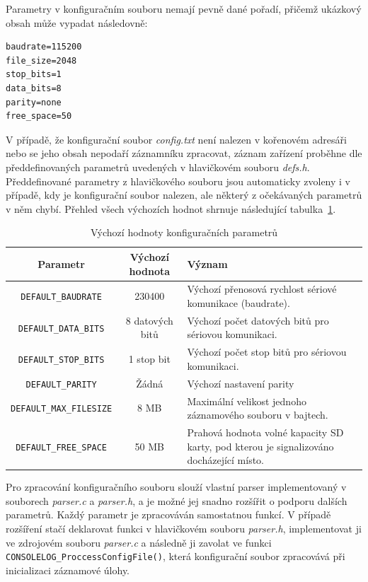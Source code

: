 Parametry v konfiguračním souboru nemají pevně dané pořadí, přičemž ukázkový obsah může vypadat následovně:

\begin{verbatim}
baudrate=115200
file_size=2048
stop_bits=1
data_bits=8
parity=none
free_space=50
\end{verbatim}

V případě, že konfigurační soubor \textit{config.txt} není nalezen v kořenovém adresáři nebo se jeho obsah nepodaří záznamníku zpracovat, záznam zařízení proběhne dle předdefinovaných parametrů uvedených v hlavičkovém souboru \textit{defs.h}. Předdefinované parametry z hlavičkového souboru jsou automaticky zvoleny i v případě, kdy je konfigurační soubor nalezen, ale některý z očekávaných parametrů v něm chybí. Přehled všech výchozích hodnot shrnuje následující tabulka~\ref{tab:default-parameters}.

\begin{table}[h]
    \centering
    \begin{tabularx}{\textwidth}{|c|c|X|}
        \hline
        \textbf{Parametr} & \textbf{Výchozí hodnota} & \textbf{Význam} \\
        \hline
        \texttt{DEFAULT\_BAUDRATE} & 230400 & Výchozí přenosová rychlost sériové komunikace (baudrate). \\
        \hline
        \texttt{DEFAULT\_DATA\_BITS} & 8 datových bitů & Výchozí počet datových bitů pro sériovou komunikaci. \\
        \hline
        \texttt{DEFAULT\_STOP\_BITS} & 1 stop bit & Výchozí počet stop bitů pro sériovou komunikaci. \\
        \hline
        \texttt{DEFAULT\_PARITY} & Žádná & Výchozí nastavení parity \\
        \hline
        \texttt{DEFAULT\_MAX\_FILESIZE} & 8 MB & Maximální velikost jednoho záznamového souboru v bajtech. \\
        \hline
        \texttt{DEFAULT\_FREE\_SPACE} & 50 MB & Prahová hodnota volné kapacity SD karty, pod kterou je signalizováno docházející místo. \\
        \hline
    \end{tabularx}
    \caption{Výchozí hodnoty konfiguračních parametrů}
    \label{tab:default-parameters}
\end{table}

Pro zpracování konfiguračního souboru slouží vlastní parser implementovaný v souborech \textit{parser.c} a \textit{parser.h}, a je možné jej snadno rozšířit o podporu dalších parametrů. Každý parametr je zpracováván samostatnou funkcí. V případě rozšíření stačí deklarovat funkci v hlavičkovém souboru \textit{parser.h}, implementovat ji ve zdrojovém souboru \textit{parser.c} a následně ji zavolat ve funkci \texttt{CONSOLELOG\_ProccessConfigFile()}, která konfigurační soubor zpracovává při inicializaci záznamové úlohy.


